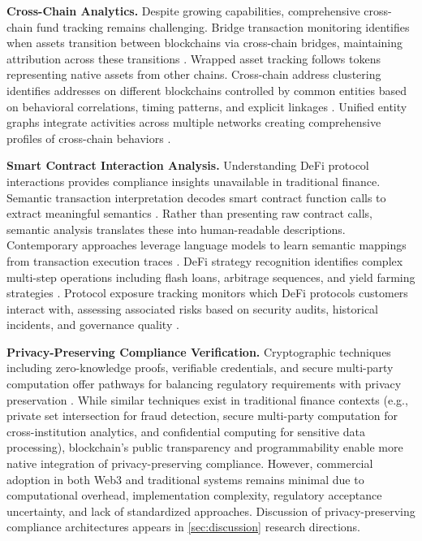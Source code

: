 \noindent\textbf{Cross-Chain Analytics.}
Despite growing capabilities, comprehensive cross-chain fund tracking remains challenging. Bridge transaction monitoring identifies when assets transition between blockchains via cross-chain bridges, maintaining attribution across these transitions \cite{yousaf2019tracingtransactionscryptocurrency,zamyatin2021sokcommunicationdistributed,zhang2024securitycrosschainbridges}. Wrapped asset tracking follows tokens representing native assets from other chains. Cross-chain address clustering identifies addresses on different blockchains controlled by common entities based on behavioral correlations, timing patterns, and explicit linkages \cite{lin2024crosschainabnormaltransaction}. Unified entity graphs integrate activities across multiple networks creating comprehensive profiles of cross-chain behaviors \cite{coquide2025alamedaresearchmultitoken}.

\noindent\textbf{Smart Contract Interaction Analysis.}
Understanding DeFi protocol interactions provides compliance insights unavailable in traditional finance. Semantic transaction interpretation decodes smart contract function calls to extract meaningful semantics \cite{chen2020understandingethereumgraph,victor2019measuringethereumbasederc20}. Rather than presenting raw contract calls, semantic analysis translates these into human-readable descriptions. Contemporary approaches leverage language models to learn semantic mappings from transaction execution traces \cite{sun2025ethereumfrauddetection}. DeFi strategy recognition identifies complex multi-step operations including flash loans, arbitrage sequences, and yield farming strategies \cite{qin2021attackingdefiecosystem,daian2020flashboys20}. Protocol exposure tracking monitors which DeFi protocols customers interact with, assessing associated risks based on security audits, historical incidents, and governance quality \cite{sun2024sokcomprehensiveanalysis,ling2025sokstablecoindesigns}.

\noindent\textbf{Privacy-Preserving Compliance Verification.}
Cryptographic techniques including zero-knowledge proofs, verifiable credentials, and secure multi-party computation offer pathways for balancing regulatory requirements with privacy preservation \cite{ben-sasson2017scalablezeroknowledge,reed2022decentralizedidentifiersdids,zhang2024blockchainzeroknowledge}. While similar techniques exist in traditional finance contexts (e.g., private set intersection for fraud detection, secure multi-party computation for cross-institution analytics, and confidential computing for sensitive data processing), blockchain's public transparency and programmability enable more native integration of privacy-preserving compliance. However, commercial adoption in both Web3 and traditional systems remains minimal due to computational overhead, implementation complexity, regulatory acceptance uncertainty, and lack of standardized approaches. Discussion of privacy-preserving compliance architectures appears in \autoref{sec:discussion} research directions.

